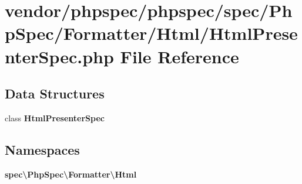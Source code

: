 \section{vendor/phpspec/phpspec/spec/\+Php\+Spec/\+Formatter/\+Html/\+Html\+Presenter\+Spec.php File Reference}
\label{_html_presenter_spec_8php}
\subsection*{Data Structures}
\begin{DoxyCompactItemize}
\item 
class {\bf Html\+Presenter\+Spec}
\end{DoxyCompactItemize}
\subsection*{Namespaces}
\begin{DoxyCompactItemize}
\item 
 {\bf spec\textbackslash{}\+Php\+Spec\textbackslash{}\+Formatter\textbackslash{}\+Html}
\end{DoxyCompactItemize}
